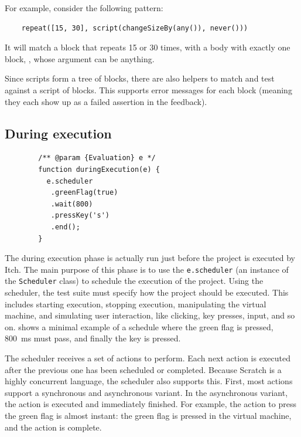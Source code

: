 \documentclass[../main]{subfiles}
\begin{document}
For example, consider the following pattern:

\begin{verbatim}
    repeat([15, 30], script(changeSizeBy(any()), never()))
\end{verbatim}

It will match a  block that repeats 15 or 30 times, with a body with exactly one block, , whose argument can be anything.

Since scripts form a tree of blocks, there are also helpers to match and test against a script of blocks.
This supports error messages for each block (meaning they each show up as a failed assertion in the feedback).

\subsection{During execution}\label{subsec:during-execution}

\begin{listing}
    \begin{verbatim}
        /** @param {Evaluation} e */
        function duringExecution(e) {
          e.scheduler
           .greenFlag(true)
           .wait(800)
           .pressKey('s')
           .end();
        }
    \end{verbatim}
    \caption{An example of the during execution phase where the scheduler is used to first press the green flag, wait \qty{800}{\milli\second}, press the  key, and finally end execution.}\label{lst:itch-scheduler-example}
\end{listing}

The during execution phase is actually run just before the project is executed by Itch.
The main purpose of this phase is to use the \texttt{e.scheduler} (an instance of the \texttt{Scheduler} class) to schedule the execution of the project.
Using the scheduler, the test suite must specify how the project should be executed.
This includes starting execution, stopping execution, manipulating the virtual machine, and simulating user interaction, like clicking, key presses, input, and so on.
 shows a minimal example of a schedule where the green flag is pressed, \qty{800}{\milli\second} must pass, and finally the  key is pressed.

The scheduler receives a set of actions to perform.
Each next action is executed after the previous one has been scheduled or completed.
Because Scratch is a highly concurrent language, the scheduler also supports this.
First, most actions support a synchronous and asynchronous variant.
In the asynchronous variant, the action is executed and immediately finished.
For example, the action to press the green flag is almost instant: the green flag is pressed in the virtual machine, and the action is complete.
\end{document}

